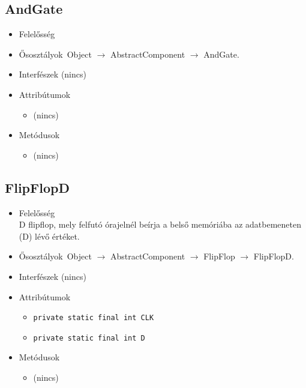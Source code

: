 \subsection{AndGate}
\begin{itemize}
\item Felelősség\\

\item Ősosztályok\ Object $\rightarrow{}$ AbstractComponent $\rightarrow{}$ AndGate.
\item Interfészek (nincs)
\item Attribútumok $\ $
\begin{itemize}
\item (nincs)
\end{itemize}
\item Metódusok$\ $
\begin{itemize}
\item (nincs)
\end{itemize}
\end{itemize}

\subsection{FlipFlopD}
\begin{itemize}
\item Felelősség\\
D flipflop, mely felfutó órajelnél beírja a belső memóriába az adatbemeneten (D)  lévő értéket.
\item Ősosztályok\ Object $\rightarrow{}$ AbstractComponent $\rightarrow{}$ FlipFlop $\rightarrow{}$ FlipFlopD.
\item Interfészek (nincs)
\item Attribútumok $\ $
\begin{itemize}
	\item \texttt{private static final int CLK} 
	\item \texttt{private static final int D} 
\end{itemize}
\item Metódusok$\ $
\begin{itemize}
\item (nincs)
\end{itemize}
\end{itemize}

